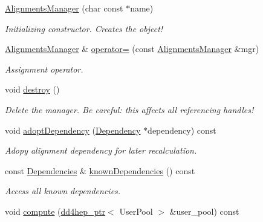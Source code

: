 \begin{DoxyCompactItemize}
\hyperlink{class_d_d4hep_1_1_alignments_1_1_alignments_manager_a7999f59e5ea1524757ff4ae11286d0b0}{AlignmentsManager} (char const $\ast$name)
\begin{DoxyCompactList}\small\item\em Initializing constructor. Creates the object! \item\end{DoxyCompactList}\item 
\hyperlink{class_d_d4hep_1_1_alignments_1_1_alignments_manager}{AlignmentsManager} \& \hyperlink{class_d_d4hep_1_1_alignments_1_1_alignments_manager_afd59ebd7fe38dfa4030f10dd4cae328d}{operator=} (const \hyperlink{class_d_d4hep_1_1_alignments_1_1_alignments_manager}{AlignmentsManager} \&mgr)
\begin{DoxyCompactList}\small\item\em Assignment operator. \item\end{DoxyCompactList}\item 
void \hyperlink{class_d_d4hep_1_1_alignments_1_1_alignments_manager_aa4254e4ad73fb728b05d8c4134f1b7ac}{destroy} ()
\begin{DoxyCompactList}\small\item\em Delete the manager. Be careful: this affects all referencing handles! \item\end{DoxyCompactList}\item 
void \hyperlink{class_d_d4hep_1_1_alignments_1_1_alignments_manager_a15ebfa44e5c30c79175876e81b52bc9a}{adoptDependency} (\hyperlink{class_d_d4hep_1_1_conditions_1_1_condition_dependency}{Dependency} $\ast$dependency) const 
\begin{DoxyCompactList}\small\item\em Adopy alignment dependency for later recalculation. \item\end{DoxyCompactList}\item 
const \hyperlink{class_d_d4hep_1_1_conditions_1_1_conditions_dependency_collection}{Dependencies} \& \hyperlink{class_d_d4hep_1_1_alignments_1_1_alignments_manager_afb8a66c27828028df5b869cb665ba87d}{knownDependencies} () const 
\begin{DoxyCompactList}\small\item\em Access all known dependencies. \item\end{DoxyCompactList}\item 
void \hyperlink{class_d_d4hep_1_1_alignments_1_1_alignments_manager_a2102612d6882f1ce61d2f12bfb0c871d}{compute} (\hyperlink{class_d_d4hep_1_1dd4hep__ptr}{dd4hep\_\-ptr}$<$ UserPool $>$ \&user\_\-pool) const 

\end{DoxyCompactItemize}
